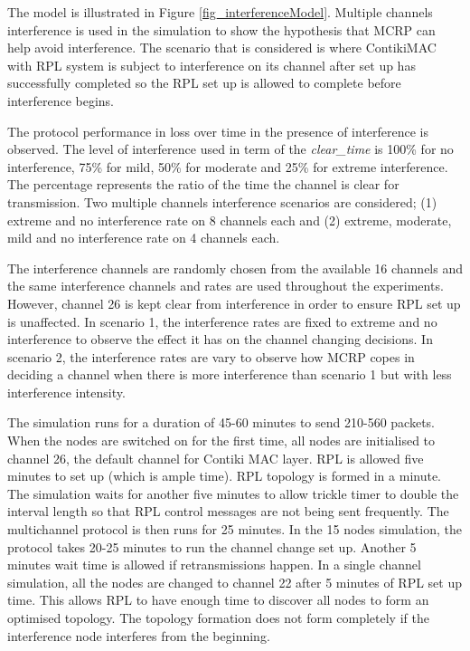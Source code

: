 The model is illustrated in Figure \ref{fig_interferenceModel}.
Multiple channels interference is used in the simulation to show the hypothesis that MCRP can help avoid interference. The scenario that is considered is where ContikiMAC with RPL system is subject to interference on its channel after set up has successfully completed so the RPL set up is allowed to complete before interference begins.


The protocol performance in loss over time in the presence of interference is observed. The level of interference used in term of the \textit{clear\_time} is 100\% for no interference, 75\% for mild, 50\% for moderate and 25\% for extreme interference. The percentage represents the ratio of the time the channel is clear for transmission.
Two multiple channels interference scenarios are considered; (1) extreme and no interference rate on 8 channels each and (2) extreme, moderate, mild and no interference rate on 4 channels each.

The interference channels are randomly chosen from the available 16 channels and the same interference channels and rates are used throughout the experiments. However, channel 26 is kept clear from interference in order to ensure RPL set up is unaffected. In scenario 1, the interference rates are fixed to extreme and no interference to observe the effect it has on the channel changing decisions. In scenario 2, the interference rates are vary to observe how MCRP copes in deciding a channel when there is more interference than scenario 1 but with less interference intensity. 

The simulation runs for a duration of 45-60 minutes to send 210-560 packets. When the nodes are switched on for the first time, all nodes are initialised to channel 26, the default channel for Contiki MAC layer. RPL is allowed five minutes to set up (which is ample time). RPL topology is formed in a minute. The simulation waits for another five minutes to allow trickle timer to double the interval length so that RPL control messages are not being sent frequently. The multichannel protocol is then runs for 25 minutes. In the 15 nodes simulation, the protocol takes 20-25 minutes to run the channel change set up. Another 5 minutes wait time is allowed if retransmissions happen. 
In a single channel simulation, all the nodes are changed to channel 22 after 5 minutes of RPL set up time. This allows RPL to have enough time to discover all nodes to form an optimised topology. The topology formation does not form completely if the interference node interferes from the beginning. 

